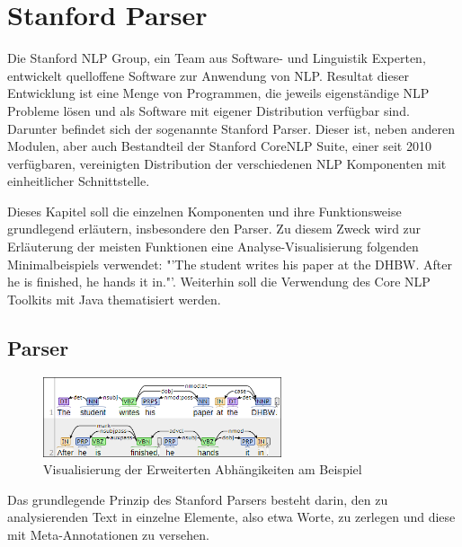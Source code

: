 \section{Stanford Parser}


Die Stanford \ac{NLP} Group, ein Team aus Software- und Linguistik Experten, entwickelt quelloffene Software zur Anwendung von \ac{NLP}. Resultat dieser Entwicklung ist eine Menge von Programmen, die jeweils eigenständige \ac{NLP} Probleme lösen und als Software mit eigener Distribution verfügbar sind. Darunter befindet sich der sogenannte Stanford Parser. Dieser ist, neben anderen Modulen, aber auch Bestandteil der Stanford CoreNLP Suite, einer seit 2010 verfügbaren, vereinigten Distribution der verschiedenen \ac{NLP} Komponenten mit einheitlicher Schnittstelle.\par
Dieses Kapitel soll die einzelnen Komponenten und ihre Funktionsweise grundlegend erläutern, insbesondere den Parser. Zu diesem Zweck wird zur Erläuterung der meisten Funktionen eine Analyse-Visualisierung folgenden Minimalbeispiels verwendet: "'The student writes his paper at the DHBW. After he is finished, he hands it in."'. Weiterhin soll die Verwendung des Core NLP Toolkits mit Java thematisiert werden. 

\subsection{Parser}
\begin{figure}
\includegraphics[width=7cm]{pictures/Parser.png}
\caption{Visualisierung der Erweiterten Abhängikeiten am Beispiel}
\label{fig:ENHDEPS}
\end{figure}
Das grundlegende Prinzip des Stanford Parsers  besteht darin, den zu analysierenden Text in einzelne Elemente, also etwa Worte, zu zerlegen und diese mit Meta-Annotationen zu versehen.


